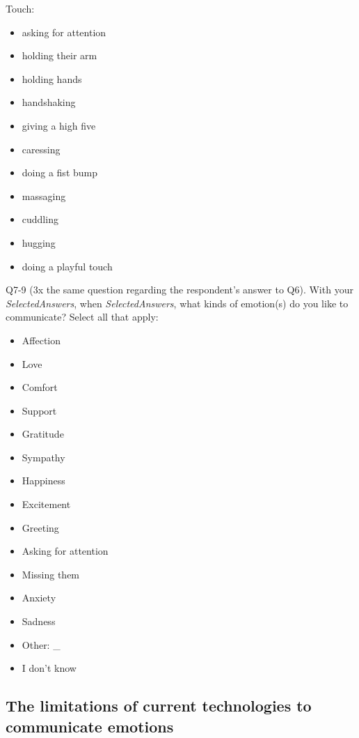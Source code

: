 \documentclass[acmsmall]{acmart}
\begin{document}
Touch:
\begin{itemize}
\item asking for attention 
\item holding their arm  
\item holding hands  
\item handshaking  
\item giving a high five  
\item caressing  
\item doing a fist bump  
\item massaging  
\item cuddling  
\item hugging  
\item doing a playful touch  
\end{itemize}

Q7-9 (3x the same question regarding the respondent’s answer to Q6). 
With your \emph{SelectedAnswers}, when \emph{SelectedAnswers}, what kinds of emotion(s) do you like to communicate? 
Select all that apply:
\begin{itemize}
\item Affection 
\item Love  
\item Comfort  
\item Support  
\item Gratitude 
\item Sympathy  
\item Happiness  
\item Excitement  
\item Greeting 
\item Asking for attention  
\item Missing them  
\item Anxiety  
\item Sadness  
\item Other:  \_
\item I don't know  
\end{itemize}

\subsection{The limitations of current technologies to communicate emotions}
\end{document}
